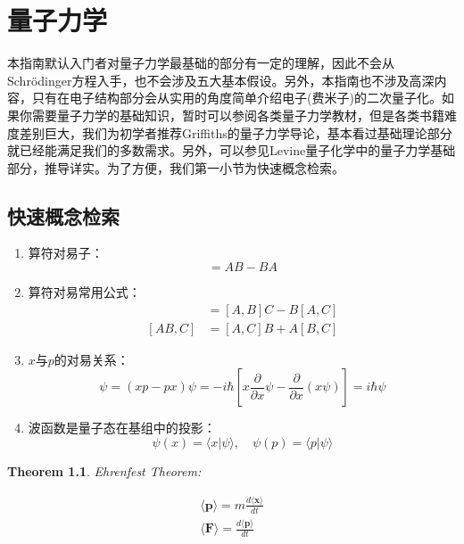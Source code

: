 \documentclass[12pt,a4paper,openany,twoside]{book}
\newtheorem{theorem}{Theorem}[section]
\numberwithin{equation}{section}
\newcommand{\mean}[1]{\langle #1 \rangle}
\begin{document}
  \chapter{量子力学}
  本指南默认入门者对量子力学最基础的部分有一定的理解，因此不会从Schr\"odinger方程入手，也不会涉及五大基本假设。另外，本指南也不涉及高深内容，只有在电子结构部分会从实用的角度简单介绍电子(费米子)的二次量子化。如果你需要量子力学的基础知识，暂时可以参阅各类量子力学教材，但是各类书籍难度差别巨大，我们为初学者推荐Griffiths的量子力学导论，基本看过基础理论部分就已经能满足我们的多数需求。另外，可以参见Levine量子化学中的量子力学基础部分，推导详实。为了方便，我们第一小节为快速概念检索。

  \section{快速概念检索}
    \begin{enumerate}
    \item 算符对易子：
    \begin{equation}
    [A,B] = AB - BA
    \end{equation}

    \item 算符对易常用公式：
    \begin{align}
    [A,BC]& = [A,B]C - B[A,C]\\
    [AB,C]& = [A,C]B + A[B,C]
    \end{align}

    \item $x$与$p$的对易关系：
    \begin{equation}
    [x,p]\psi=(xp-px)\psi = -i\hbar[x \frac{\partial}{\partial x}\psi-\frac{\partial}{\partial x}(x\psi)]= i\hbar \psi
    \end{equation}

    \item 波函数是量子态在基组中的投影：
    \begin{equation}
    \psi (x) = \langle x | \psi \rangle , \quad \psi(p) = \langle p | \psi \rangle
    \end{equation} 
  \end{enumerate}
  

  \begin{theorem}
    Ehrenfest Theorem:
    
    \begin{align}
    \mean{\textbf{p}}= m \frac{d \mean{\textbf{x}}}{dt}\\
    \mean{\textbf{F}}= \frac{d\mean{\textbf{p}}}{dt}
    \end{align}
    \end{theorem}
\end{document}
